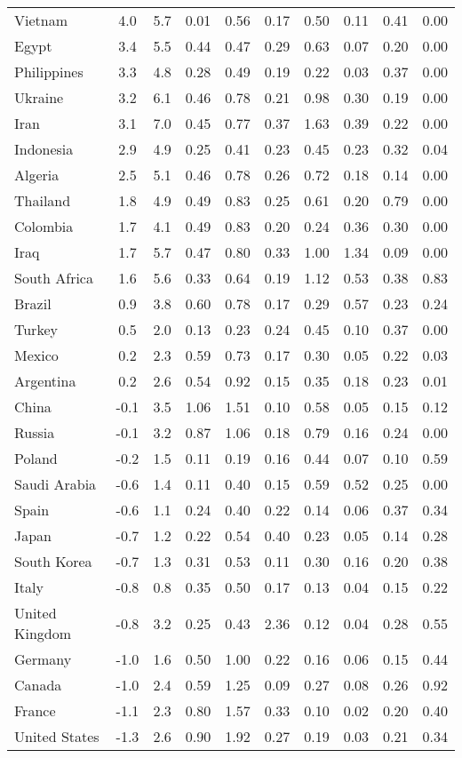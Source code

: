\begin{tabular}[t]{lccccccccc}
Vietnam & 4.0 & 5.7 & 0.01 & 0.56 & 0.17 & 0.50 & 0.11 & 0.41 & 0.00\\
Egypt & 3.4 & 5.5 & 0.44 & 0.47 & 0.29 & 0.63 & 0.07 & 0.20 & 0.00\\
Philippines & 3.3 & 4.8 & 0.28 & 0.49 & 0.19 & 0.22 & 0.03 & 0.37 & 0.00\\
Ukraine & 3.2 & 6.1 & 0.46 & 0.78 & 0.21 & 0.98 & 0.30 & 0.19 & 0.00\\
Iran & 3.1 & 7.0 & 0.45 & 0.77 & 0.37 & 1.63 & 0.39 & 0.22 & 0.00\\
Indonesia & 2.9 & 4.9 & 0.25 & 0.41 & 0.23 & 0.45 & 0.23 & 0.32 & 0.04\\
Algeria & 2.5 & 5.1 & 0.46 & 0.78 & 0.26 & 0.72 & 0.18 & 0.14 & 0.00\\
Thailand & 1.8 & 4.9 & 0.49 & 0.83 & 0.25 & 0.61 & 0.20 & 0.79 & 0.00\\
Colombia & 1.7 & 4.1 & 0.49 & 0.83 & 0.20 & 0.24 & 0.36 & 0.30 & 0.00\\
Iraq & 1.7 & 5.7 & 0.47 & 0.80 & 0.33 & 1.00 & 1.34 & 0.09 & 0.00\\
South Africa & 1.6 & 5.6 & 0.33 & 0.64 & 0.19 & 1.12 & 0.53 & 0.38 & 0.83\\
Brazil & 0.9 & 3.8 & 0.60 & 0.78 & 0.17 & 0.29 & 0.57 & 0.23 & 0.24\\
Turkey & 0.5 & 2.0 & 0.13 & 0.23 & 0.24 & 0.45 & 0.10 & 0.37 & 0.00\\
Mexico & 0.2 & 2.3 & 0.59 & 0.73 & 0.17 & 0.30 & 0.05 & 0.22 & 0.03\\
Argentina & 0.2 & 2.6 & 0.54 & 0.92 & 0.15 & 0.35 & 0.18 & 0.23 & 0.01\\
China & -0.1 & 3.5 & 1.06 & 1.51 & 0.10 & 0.58 & 0.05 & 0.15 & 0.12\\
Russia & -0.1 & 3.2 & 0.87 & 1.06 & 0.18 & 0.79 & 0.16 & 0.24 & 0.00\\
Poland & -0.2 & 1.5 & 0.11 & 0.19 & 0.16 & 0.44 & 0.07 & 0.10 & 0.59\\
Saudi Arabia & -0.6 & 1.4 & 0.11 & 0.40 & 0.15 & 0.59 & 0.52 & 0.25 & 0.00\\
Spain & -0.6 & 1.1 & 0.24 & 0.40 & 0.22 & 0.14 & 0.06 & 0.37 & 0.34\\
Japan & -0.7 & 1.2 & 0.22 & 0.54 & 0.40 & 0.23 & 0.05 & 0.14 & 0.28\\
South Korea & -0.7 & 1.3 & 0.31 & 0.53 & 0.11 & 0.30 & 0.16 & 0.20 & 0.38\\
Italy & -0.8 & 0.8 & 0.35 & 0.50 & 0.17 & 0.13 & 0.04 & 0.15 & 0.22\\
United Kingdom & -0.8 & 3.2 & 0.25 & 0.43 & 2.36 & 0.12 & 0.04 & 0.28 & 0.55\\
Germany & -1.0 & 1.6 & 0.50 & 1.00 & 0.22 & 0.16 & 0.06 & 0.15 & 0.44\\
Canada & -1.0 & 2.4 & 0.59 & 1.25 & 0.09 & 0.27 & 0.08 & 0.26 & 0.92\\
France & -1.1 & 2.3 & 0.80 & 1.57 & 0.33 & 0.10 & 0.02 & 0.20 & 0.40\\
United States & -1.3 & 2.6 & 0.90 & 1.92 & 0.27 & 0.19 & 0.03 & 0.21 & 0.34\\
\bottomrule
\end{tabular}